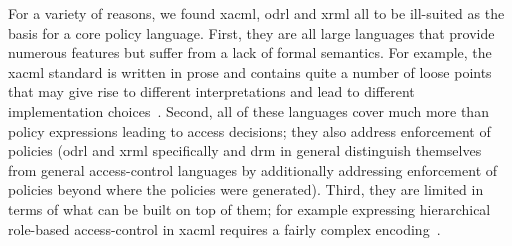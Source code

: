 \documentclass[runningheads,a4paper]{llncs}
\begin{document}

For a variety of reasons, we found \ac{xacml}, \ac{odrl} and \ac{xrml}
all to be ill-suited as the basis for a core policy language.  First,
they are all large languages that provide numerous features but suffer
from a lack of formal semantics. For example, the \ac{xacml} standard
is written in prose and contains quite a number of loose points that
may give rise to different interpretations and lead to different
implementation choices~\cite{DBLP:conf/essos/MasiPT12}.  Second, all
of these languages cover much more than policy expressions leading to
access decisions; they also address enforcement of policies (\ac{odrl}
and \ac{xrml} specifically and \ac{drm} in general distinguish
themselves from general access-control languages by additionally
addressing enforcement of policies beyond where the policies were
generated). Third, they are limited in terms of what can be built on
top of them; for example expressing hierarchical role-based
access-control in \ac{xacml} requires a fairly complex
encoding~\cite{Tschantz}.

\end{document}
